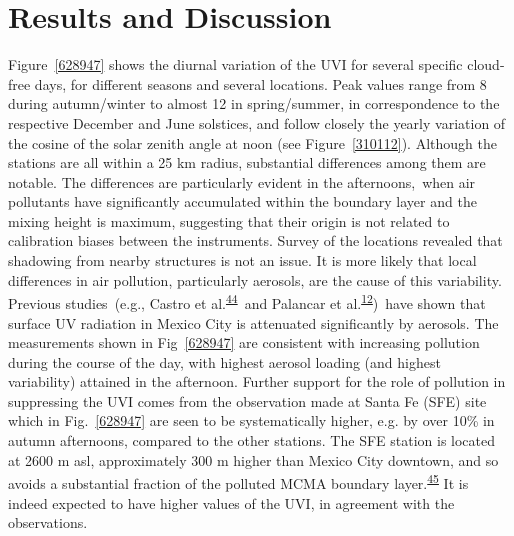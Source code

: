 \documentclass[10pt]{article}
\begin{document}
\section*{Results and Discussion}

{\label{447962}}

Figure~{\ref{628947}} shows the diurnal variation of
the UVI for several specific cloud-free days, for different seasons and
several locations. Peak values range from 8 during autumn/winter to
almost 12 in spring/summer, in correspondence to the respective December
and June solstices, and follow closely the yearly variation of the
cosine of the solar zenith angle at noon (see
Figure~{\ref{310112}}). Although the stations are all
within a 25 km radius, substantial differences among them are notable.
The differences are particularly evident in the afternoons,~when air
pollutants have significantly accumulated within the boundary layer and
the mixing height is maximum, suggesting that their origin is not
related to calibration biases between the instruments. Survey of the
locations revealed that shadowing from nearby structures is not an
issue. It is more likely that local differences in air pollution,
particularly aerosols, are the cause of this variability. Previous
studies~(e.g., Castro et al.\textsuperscript{\hyperref[csl:44]{44}}~and Palancar et
al.\textsuperscript{\hyperref[csl:12]{12}})~have shown that surface UV radiation in Mexico
City is attenuated significantly by aerosols. The measurements shown in
Fig~{\ref{628947}} are consistent with increasing
pollution during the course of the day, with highest aerosol loading
(and highest variability) attained in the afternoon. Further support for
the role of pollution in suppressing the UVI comes from the observation
made at Santa Fe (SFE) site which in
Fig.~{\ref{628947}} are seen to be systematically
higher, e.g. by over 10\% in autumn afternoons, compared to the other
stations. The SFE station is located at 2600 m asl, approximately 300 m
higher than Mexico City downtown, and so avoids a substantial fraction
of the polluted MCMA boundary layer.\textsuperscript{\hyperref[csl:45]{45}} It is indeed
expected to have higher values of the UVI, in agreement with the
observations.
\end{document}
